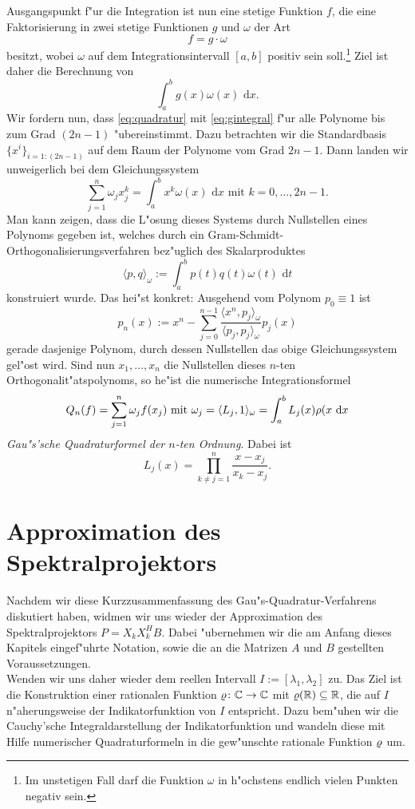 Ausgangspunkt f"ur die Integration ist nun eine stetige Funktion $f$, die eine Faktorisierung in zwei stetige Funktionen $g$ und $\omega$ der Art
\[
f = g\cdot \omega
\]
besitzt, wobei $\omega$ auf dem Integrationsintervall $[a,b]$ positiv sein soll.\footnote{Im unstetigen Fall darf die Funktion $\omega$ in h"ochstens endlich vielen Punkten negativ sein.} Ziel ist daher die Berechnung von
\begin{equation}\label{eq:gintegral}
\int_a^b g(x)\omega(x) \text{ d}x.
\end{equation}
Wir fordern nun, dass \eqref{eq:quadratur} mit \eqref{eq:gintegral} f"ur alle Polynome bis zum Grad $(2n-1)$ "ubereinstimmt.
Dazu betrachten wir die Standardbasis $\{x^i\}_{i=1:(2n-1)}$ auf dem Raum der Polynome vom
Grad $2n-1$. Dann landen wir unweigerlich bei dem
Gleichungssystem
\[
\sum_{j=1}^n \omega_j x_j^k = \int_a^b x^k \omega(x) \text{ d}x \text{ mit } k = 0,\ldots,2n-1.
\]
Man kann zeigen, dass die L"osung dieses Systems durch Nullstellen eines Polynoms gegeben ist, welches durch
ein Gram-Schmidt-Orthogonalisierungsverfahren bez"uglich des Skalarproduktes
\[
\langle p,q\rangle_\omega := \int_a^b p(t) q(t)\omega(t) \text{ d}t
\]
konstruiert wurde. Das hei"st konkret: Ausgehend vom Polynom $p_0 \equiv 1$ ist
\[
p_n(x) := x^n - \sum_{j=0}^{n-1} \frac{\langle x^n, p_j \rangle_\omega}{\langle p_j, p_j\rangle_\omega} p_j (x)
\]
gerade dasjenige Polynom, durch dessen Nullstellen das obige Gleichungssystem gel"ost wird. Sind nun
$x_1,\ldots,x_n$ die Nullstellen dieses $n$-ten Orthogonalit"atspolynoms, so he"ist die numerische
Integrationsformel
\[
Q_n(f) = \sum_{j=1}^n \omega_j f(x_j) \text{ mit }
\omega_j = \langle L_j, 1 \rangle_\omega
= \int_a^b L_j(x)\rho(x\text{ d}x
\]
\emph{Gau"s'sche Quadraturformel der $n$-ten Ordnung}.
Dabei ist
\[
L_j(x) = \prod_{k\neq j=1}^n \frac{x-x_j}{x_k - x_j}.
\]

\section{Approximation des Spektralprojektors}

Nachdem wir diese Kurzzusammenfassung des Gau"s-Quadratur-Verfahrens diskutiert haben,
widmen wir uns wieder der Approximation des Spektralprojektors
$P = X_k X_k^H B$. Dabei "ubernehmen wir die am Anfang dieses Kapitels eingef"uhrte Notation, sowie die an die Matrizen $A$ und $B$ gestellten Voraussetzungen.\\

Wenden wir uns daher wieder dem reellen Intervall $I := [\lambda_1, \lambda_2]$ zu. Das Ziel ist
die Konstruktion einer rationalen Funktion $\varrho\colon\mathbb{C}\to\mathbb{C}$ mit $\varrho(\mathbb{R}) \subseteq \mathbb{R}$,
die auf $I$ n"aherungsweise der Indikatorfunktion von $I$ entspricht. Dazu
bem"uhen wir die Cauchy'sche Integraldarstellung der Indikatorfunktion und
wandeln diese mit Hilfe numerischer Quadraturformeln in die gew"unschte
rationale Funktion $\varrho$ um.\\

